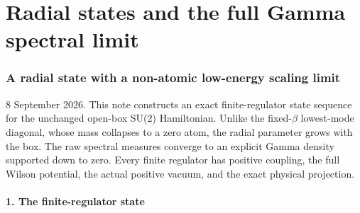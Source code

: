 \documentclass[
  11pt,
]{article}
\begin{document}
\clearpage
\part{Radial states and the full Gamma spectral limit}
\section{A radial state with a non-atomic low-energy scaling
limit}\label{weak-coupling-part-4-a-radial-state-with-a-non-atomic-low-energy-scaling-limit}

8 September 2026. This note constructs an exact finite-regulator state
sequence for the unchanged open-box SU(2) Hamiltonian. Unlike the
fixed-\(\beta\) lowest-mode diagonal, whose mass collapses to a zero
atom, the radial parameter grows with the box. The raw spectral measures
converge to an explicit Gamma density supported down to zero. Every
finite regulator has positive coupling, the full Wilson potential, the
actual positive vacuum, and the exact physical projection.

\subsection{1. The finite-regulator
state}\label{weak-coupling-part-4-the-finite-regulator-state}
\end{document}
